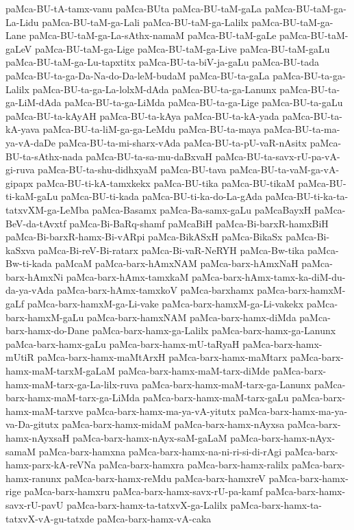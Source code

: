 {paMca-BU-tA-tamx-vanu
paMca-BUta
paMca-BU-taM-gaLa
paMca-BU-taM-ga-La-Lidu
paMca-BU-taM-ga-Lali
paMca-BU-taM-ga-Lalilx
paMca-BU-taM-ga-Lane
paMca-BU-taM-ga-La-sAthx-namaM
paMca-BU-taM-gaLe
paMca-BU-taM-gaLeV
paMca-BU-taM-ga-Lige
paMca-BU-taM-ga-Live
paMca-BU-taM-gaLu
paMca-BU-taM-ga-Lu-tapxtitx
paMca-BU-ta-biV-ja-gaLu
paMca-BU-tada
paMca-BU-ta-ga-Da-Na-do-Da-leM-budaM
paMca-BU-ta-gaLa
paMca-BU-ta-ga-Lalilx
paMca-BU-ta-ga-La-lolxM-dAda
paMca-BU-ta-ga-Lanunx
paMca-BU-ta-ga-LiM-dAda
paMca-BU-ta-ga-LiMda
paMca-BU-ta-ga-Lige
paMca-BU-ta-gaLu
paMca-BU-ta-kAyAH
paMca-BU-ta-kAya
paMca-BU-ta-kA-yada
paMca-BU-ta-kA-yava
paMca-BU-ta-liM-ga-ga-LeMdu
paMca-BU-ta-maya
paMca-BU-ta-ma-ya-vA-daDe
paMca-BU-ta-mi-sharx-vAda
paMca-BU-ta-pU-vaR-nAsitx
paMca-BU-ta-sAthx-nada
paMca-BU-ta-sa-mu-daBxvaH
paMca-BU-ta-savx-rU-pa-vA-gi-ruva
paMca-BU-ta-shu-didhxyaM
paMca-BU-tava
paMca-BU-ta-vaM-ga-vA-gipapx
paMca-BU-ti-kA-tamxkekx
paMca-BU-tika
paMca-BU-tikaM
paMca-BU-ti-kaM-gaLu
paMca-BU-ti-kada
paMca-BU-ti-ka-do-La-gAda
paMca-BU-ti-ka-ta-tatxvXM-ga-LeMba
paMca-Basamx
paMca-Ba-samx-gaLu
paMcaBayxH
paMca-BeV-da-tAvxtf
paMca-Bi-BaRq-shamf
paMcaBiH
paMca-Bi-barxR-hamxBiH
paMca-Bi-barxR-hamx-Bi-vARpi
paMca-BikASxH
paMca-BikaSx
paMca-Bi-kaSxva
paMca-Bi-reV-Bi-ratarx
paMca-Bi-vaR-NeRYH
paMca-Bw-tika
paMca-Bw-ti-kada
paMcaM
paMca-barx-hAmxNAM
paMca-barx-hAmxNaH
paMca-barx-hAmxNi
paMca-barx-hAmx-tamxkaM
paMca-barx-hAmx-tamx-ka-diM-du-da-ya-vAda
paMca-barx-hAmx-tamxkoV
paMca-barxhamx
paMca-barx-hamxM-gaLf
paMca-barx-hamxM-ga-Li-vake
paMca-barx-hamxM-ga-Li-vakekx
paMca-barx-hamxM-gaLu
paMca-barx-hamxNAM
paMca-barx-hamx-diMda
paMca-barx-hamx-do-Dane
paMca-barx-hamx-ga-Lalilx
paMca-barx-hamx-ga-Lanunx
paMca-barx-hamx-gaLu
paMca-barx-hamx-mU-taRyaH
paMca-barx-hamx-mUtiR
paMca-barx-hamx-maMtArxH
paMca-barx-hamx-maMtarx
paMca-barx-hamx-maM-tarxM-gaLaM
paMca-barx-hamx-maM-tarx-diMde
paMca-barx-hamx-maM-tarx-ga-La-lilx-ruva
paMca-barx-hamx-maM-tarx-ga-Lanunx
paMca-barx-hamx-maM-tarx-ga-LiMda
paMca-barx-hamx-maM-tarx-gaLu
paMca-barx-hamx-maM-tarxve
paMca-barx-hamx-ma-ya-vA-yitutx
paMca-barx-hamx-ma-ya-va-Da-gitutx
paMca-barx-hamx-midaM
paMca-barx-hamx-nAyxsa
paMca-barx-hamx-nAyxsaH
paMca-barx-hamx-nAyx-saM-gaLaM
paMca-barx-hamx-nAyx-samaM
paMca-barx-hamxna
paMca-barx-hamx-na-ni-ri-si-di-rAgi
paMca-barx-hamx-parx-kA-reVNa
paMca-barx-hamxra
paMca-barx-hamx-ralilx
paMca-barx-hamx-ranunx
paMca-barx-hamx-reMdu
paMca-barx-hamxreV
paMca-barx-hamx-rige
paMca-barx-hamxru
paMca-barx-hamx-savx-rU-pa-kamf
paMca-barx-hamx-savx-rU-pavU
paMca-barx-hamx-ta-tatxvX-ga-Lalilx
paMca-barx-hamx-ta-tatxvX-vA-gu-tatxde
paMca-barx-hamx-vA-caka
}
